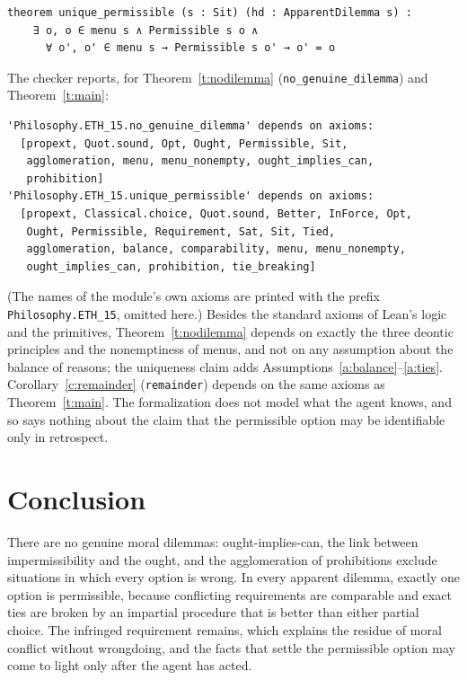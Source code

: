 \documentclass{situationist-preprint}
\begin{document}
\begin{lstlisting}
theorem unique_permissible (s : Sit) (hd : ApparentDilemma s) :
    ∃ o, o ∈ menu s ∧ Permissible s o ∧
      ∀ o', o' ∈ menu s → Permissible s o' → o' = o
\end{lstlisting}

The checker reports, for Theorem~\ref{t:nodilemma} (\texttt{no\_genuine\_dilemma}) and Theorem~\ref{t:main}:

\begin{lstlisting}
'Philosophy.ETH_15.no_genuine_dilemma' depends on axioms:
  [propext, Quot.sound, Opt, Ought, Permissible, Sit,
   agglomeration, menu, menu_nonempty, ought_implies_can,
   prohibition]
'Philosophy.ETH_15.unique_permissible' depends on axioms:
  [propext, Classical.choice, Quot.sound, Better, InForce, Opt,
   Ought, Permissible, Requirement, Sat, Sit, Tied,
   agglomeration, balance, comparability, menu, menu_nonempty,
   ought_implies_can, prohibition, tie_breaking]
\end{lstlisting}

(The names of the module's own axioms are printed with the prefix \texttt{Philosophy.ETH\_15}, omitted here.) Besides the standard axioms of Lean's logic and the primitives, Theorem~\ref{t:nodilemma} depends on exactly the three deontic principles and the nonemptiness of menus, and not on any assumption about the balance of reasons; the uniqueness claim adds Assumptions~\ref{a:balance}--\ref{a:ties}. Corollary~\ref{c:remainder} (\texttt{remainder}) depends on the same axioms as Theorem~\ref{t:main}. The formalization does not model what the agent knows, and so says nothing about the claim that the permissible option may be identifiable only in retrospect.

\section{Conclusion}

There are no genuine moral dilemmas: ought-implies-can, the link between impermissibility and the ought, and the agglomeration of prohibitions exclude situations in which every option is wrong. In every apparent dilemma, exactly one option is permissible, because conflicting requirements are comparable and exact ties are broken by an impartial procedure that is better than either partial choice. The infringed requirement remains, which explains the residue of moral conflict without wrongdoing, and the facts that settle the permissible option may come to light only after the agent has acted.
\end{document}
